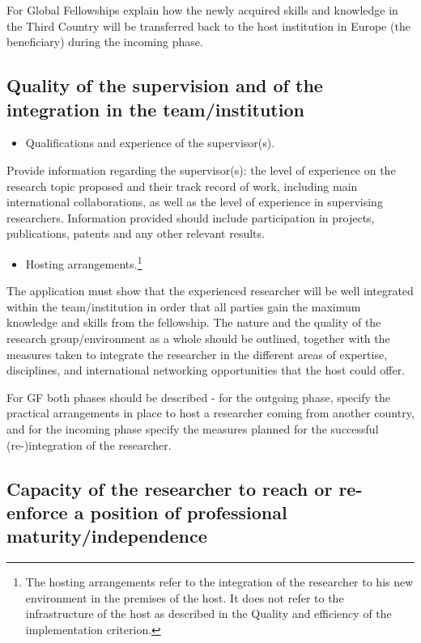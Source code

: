 \documentclass[a4paper,11pt]{article}
\begin{document}
For Global Fellowships explain how the newly acquired skills and knowledge in the Third Country will be transferred back to the host institution in Europe (the beneficiary) during the incoming phase.

\subsection{Quality of the supervision and of the integration in the team/institution}
\label{sec:supervision}

\begin{itemize}
\item Qualifications and experience of the supervisor(s).
\end{itemize}

Provide information regarding the supervisor(s): the level of experience on the research topic proposed and their track record of work, including main international collaborations, as well as the level of experience in supervising researchers. Information provided should include participation in projects, publications, patents and any other relevant results.

\begin{itemize}
\item Hosting arrangements.\footnote{The hosting arrangements refer to the integration of the researcher to his new environment in the premises of the host. It does not refer to the infrastructure of the host as described in the Quality and efficiency of the implementation criterion.}
\end{itemize}

The application must show that the experienced researcher will be well integrated within the team/institution in order that all parties gain the maximum knowledge and skills from the fellowship. The nature and the quality of the research group/environment as a whole should be outlined, together with the measures taken to integrate the researcher in the different areas of expertise, disciplines, and international networking opportunities that the host could offer.

For GF both phases should be described - for the outgoing phase, specify the practical arrangements in place to host a researcher coming from another country, and for the incoming phase specify the measures planned for the successful (re-)integration of the researcher. 

\subsection{Capacity of the researcher to reach or re-enforce a position of professional maturity/independence}
\label{sec:maturity}
\end{document}
